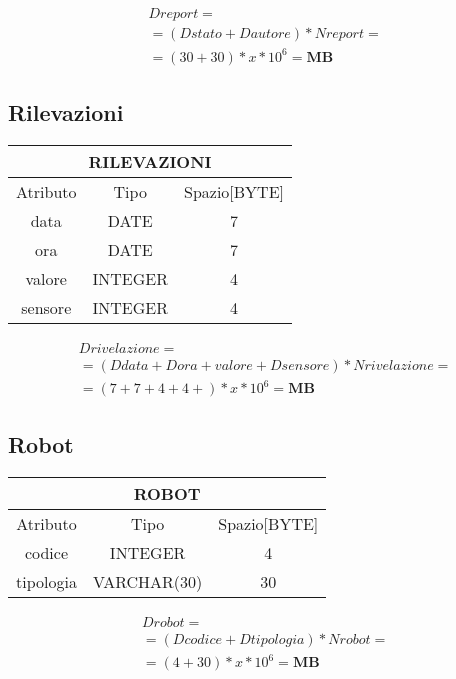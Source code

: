 \begin{equation}
  \begin{aligned}
    &Dreport =\\
    &=(Dstato+Dautore)*Nreport=\\
    &=(30+30)*x*10^6= \textbf{MB}
  \end{aligned}
\end{equation}
\subsection{Rilevazioni}
\begin{tabular}{ |c|c|c|}
  \hline
  \multicolumn{3}{|c|}{\textbf{RILEVAZIONI}}\\
  \hline
  Atributo & Tipo & Spazio[BYTE] \\
  \hline
  data & DATE & 7 \\
  ora & DATE &  7 \\
  valore & INTEGER & 4 \\
  sensore & INTEGER & 4 \\
  \hline
\end{tabular}
\begin{equation}
  \begin{aligned}
    &Drivelazione =\\
    &=(Ddata+Dora+valore+Dsensore)*Nrivelazione=\\
    &=(7+7+4+4+)*x*10^6= \textbf{MB}
  \end{aligned}
\end{equation}
\subsection{Robot}
\begin{tabular}{ |c|c|c|}
  \hline
  \multicolumn{3}{|c|}{\textbf{ROBOT}}\\
  \hline
  Atributo & Tipo & Spazio[BYTE] \\
  \hline
  codice & INTEGER & 4\\
  tipologia & VARCHAR(30) & 30\\
  \hline
\end{tabular}
\begin{equation}
  \begin{aligned}
    &Drobot =\\
    &=(Dcodice+Dtipologia)*Nrobot=\\
    &=(4+30)*x*10^6= \textbf{MB}
  \end{aligned}
\end{equation}
